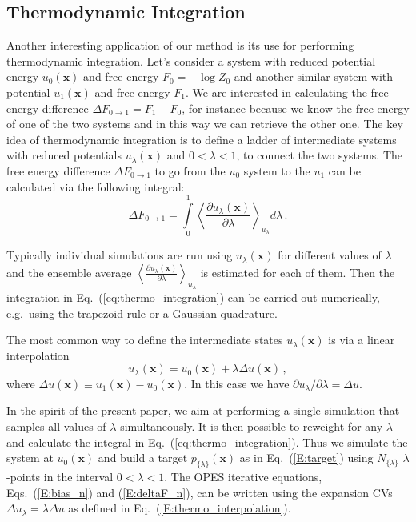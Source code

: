 \documentclass[aps,prx,reprint,superscriptaddress]{revtex4-1} %
\begin{document}
\subsection{Thermodynamic Integration\label{S:termoint}}
Another interesting application of our method is its use for performing thermodynamic integration\cite{FrenkelBook}. 
Let's consider a system with reduced potential energy $u_0(\mathbf{x})$ and free energy $F_0=-\log Z_0$ and another similar system with potential $u_1(\mathbf{x})$ and free energy $F_1$. 
We are interested in calculating the free energy difference $\Delta F_{0\rightarrow1}=F_1-F_0$, for instance because we know the free energy of one of the two systems and in this way we can retrieve the other one.
The key idea of thermodynamic integration is to define a ladder of intermediate systems with reduced potentials $u_\lambda(\mathbf{x})$ and $0<\lambda <1$, to connect the two systems.
The free energy difference $\Delta F_{0\rightarrow1}$ to go from the $u_0$ system to the $u_1$ can be calculated via the following integral:
\begin{equation}\label{eq:thermo_integration}
    \Delta F_{0\rightarrow1}=\int\limits_0^1 \left \langle \frac{\partial u_{\lambda}(\mathbf{x})}{\partial \lambda} \right \rangle_{u_\lambda}d\lambda\, .
\end{equation}

Typically individual simulations are run using $u_{\lambda}(\mathbf{x})$ for different values of $\lambda$ and the ensemble average $\left \langle \frac{\partial u_{\lambda}(\mathbf{x})}{\partial \lambda} \right \rangle_{u_\lambda}$ is estimated for each of them. 
Then the integration in Eq.~(\ref{eq:thermo_integration}) can be carried out numerically, e.g.~using the trapezoid rule or a Gaussian quadrature.

The most common way to define the intermediate states $u_\lambda(\mathbf{x})$ is via a linear interpolation
\begin{equation}\label{E:thermo_interpolation}
    u_\lambda(\mathbf{x})=u_0(\mathbf{x})+\lambda \Delta u(\mathbf{x})\, ,
\end{equation}
where $\Delta u(\mathbf{x})\equiv u_1(\mathbf{x})-u_0(\mathbf{x})$.
In this case we have $\partial u_\lambda/\partial \lambda=\Delta u$.

In the spirit of the present paper, we aim at performing a single simulation that samples all values of $\lambda$ simultaneously.
It is then possible to reweight for any $\lambda$ and calculate the integral in Eq.~(\ref{eq:thermo_integration}).
Thus we simulate the system at $u_0(\mathbf{x})$ and build a target $p_{\{\lambda\}}(\mathbf{x})$ as in Eq.~(\ref{E:target}) using $N_{\{\lambda\}}$ $\lambda$-points in the interval $0<\lambda<1$.
The OPES iterative equations, Eqs.~(\ref{E:bias_n}) and (\ref{E:deltaF_n}), can be written using the expansion CVs $\Delta u_\lambda=\lambda \Delta u$ as defined in Eq.~(\ref{E:thermo_interpolation}).
\end{document}
